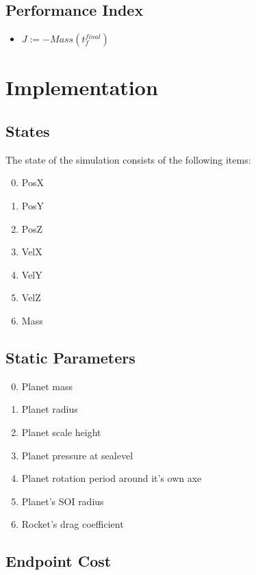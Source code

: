 \documentclass[11pt]{report}
\begin{document}
\section{Performance Index}

\begin{itemize}
\item $J := - Mass(t_f^{final})$
\end{itemize}

\chapter{Implementation}

\section{States}

The state of the simulation consists of the following items:

\begin{enumerate}
\setcounter{enumi}{-1}
\item PosX
\item PosY
\item PosZ
\item VelX
\item VelY
\item VelZ
\item Mass
\end{enumerate}

\section{Static Parameters}

\begin{enumerate}
\setcounter{enumi}{-1}
\item Planet mass
\item Planet radius
\item Planet scale height
\item Planet pressure at sealevel
\item Planet rotation period around it's own axe
\item Planet's SOI radius
\item Rocket's drag coefficient
\end{enumerate}

\section{Endpoint Cost}
\end{document}
